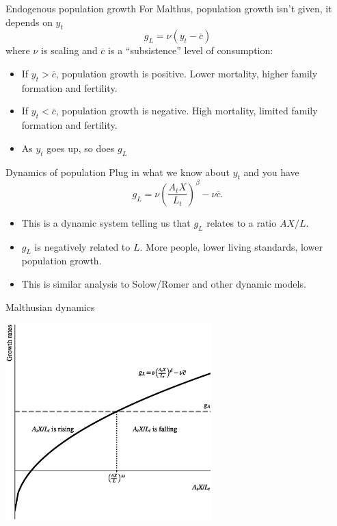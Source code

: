 \begin{frame}{Endogenous population growth}
For Malthus, population growth isn't given, it depends on $y_t$
\begin{equation}
	g_L = \nu (y_t - \overline{c}) \nonumber
\end{equation}
where $\nu$ is scaling and $\overline{c}$ is a ``subsistence'' level of consumption:
\begin{itemize}
	\item If $y_t > \overline{c}$, population growth is positive. Lower mortality, higher family formation and fertility.
	\item If $y_t < \overline{c}$, population growth is negative. High mortality, limited family formation and fertility.
	\item As $y_t$ goes up, so does $g_L$
\end{itemize}
\end{frame}

\begin{frame}{Dynamics of population}
Plug in what we know about $y_t$ and you have
\begin{equation}
	g_L = \nu \left(\frac{A_tX}{L_t}\right)^{\beta} - \nu \overline{c}. \label{EQ_gL_malthus}
\end{equation}
\begin{itemize}
	\item This is a dynamic system telling us that $g_L$ relates to a ratio $AX/L$. 
	\item $g_L$ is negatively related to $L$. More people, lower living standards, lower population growth.
	\item This is similar analysis to Solow/Romer and other dynamic models.
\end{itemize}
\end{frame}

\begin{frame}{Malthusian dynamics}
\begin{center}
\includegraphics[height=3in]{../Figures/fig-ch9-fig2.eps}
\end{center}
\end{frame}

